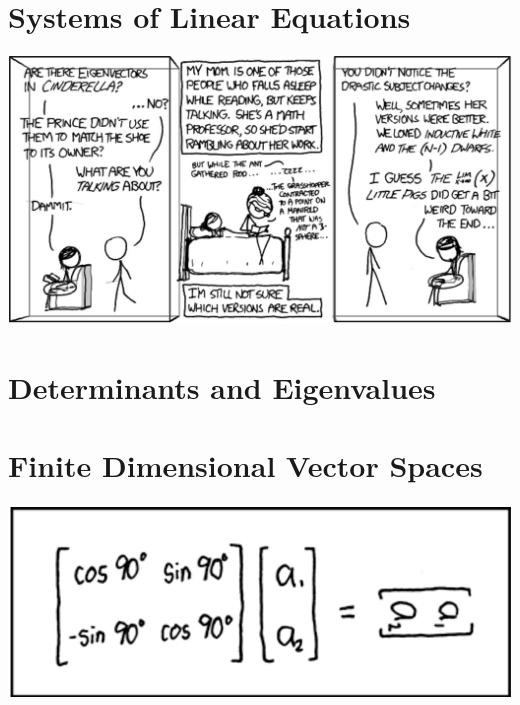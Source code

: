 \documentclass[oneside]{book}
\begin{document}
\chapter{Systems of Linear Equations}

    

\begin{savequote}
    \includegraphics[scale=0.4]{Graphics/eigenvectorxkcd.png}
\end{savequote}
\chapter{Determinants and Eigenvalues}

    

\begin{savequote}

\end{savequote}
\chapter{Finite Dimensional Vector Spaces}

    

\begin{savequote}
\includegraphics[scale=0.45]{Graphics/rotationmatrix.png}
\end{savequote}
\end{document}
